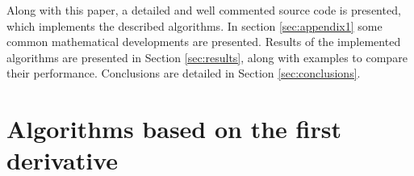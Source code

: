 \documentclass{ipol}
\numberwithin{equation}{section}
\numberwithin{table}{section}
\begin{document}
Along with this paper, a detailed and well commented source code is presented, which 
implements the described algorithms. In section \ref{sec:appendix1} some common mathematical developments are presented. 
Results of the implemented algorithms are presented in Section \ref{sec:results}, along with examples 
to compare their performance. Conclusions are detailed in Section \ref{sec:conclusions}.

\nocite{IPOL}


\section{Algorithms based on the first derivative}
\label{sec:first}
\end{document}
